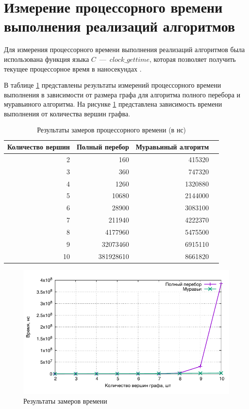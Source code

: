 \section{Измерение процессорного времени выполнения реализаций алгоритмов}

Для измерения процессорного времени выполнения реализаций алгоритмов была использована функция языка $C$~---~$clock\_gettime$, которая позволяет получить текущее процессорное время в наносекундах \cite{bib:6}.

В таблице \ref{table:time} представлены результаты измерений процессорного времени выполнения в зависимости от размера графа для алгоритма полного перебора и муравьиного алгоритма. На рисунке \ref{img:time} представлена зависимость времени выполнения от количества вершин графва.

\begin{table}[h]
  \caption{\label{table:time} Результаты замеров процессорного времени (в нс)}
  \begin{center}
    \begin{tabular}{|r|r|r|r|}
      \hline
      Количество вершин & Полный перебор & Муравьиный алгоритм \\ \hline
2 & 160 & 415320 \\ \hline 
3 & 360 & 747320 \\ \hline 
4 & 1260 & 1320880 \\ \hline 
5 & 10680 & 2144000 \\ \hline 
6 & 28900 & 3083100 \\ \hline 
7 & 211940 & 4222370 \\ \hline 
8 & 4177960 & 5475500 \\ \hline 
9 & 32073460 & 6915110 \\ \hline 
10 & 381928610 & 8661820 \\ \hline 


    \end{tabular}
  \end{center}
\end{table}

\newpage

\noindent
\begin{figure}[h!]
	\centering
    \includegraphics[width=0.75\linewidth]{../data/time}
    \caption{Результаты замеров времени}
    \label{img:time}
\end{figure}

\newpage